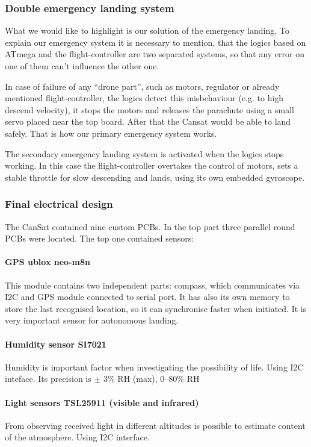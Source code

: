 \documentclass{cfp}
\begin{document}
\subsubsection{Double emergency landing system}
\par What we would like to highlight is our solution of the emergency landing. To explain our emergency system it is necessary to mention, that the logics based on ATmega and the flight-controller are two separated systems, so that any error on one of them can’t influence the other one. 
\par In case of failure of any “drone part”, such as motors, regulator or already mentioned flight-controller, the logics detect this misbehaviour (e.g. to high descend velocity), it stops the motors and releases the parachute using a small servo placed near the top board. After that the Cansat would be able to land safely. That is how our primary emergency system works.
\par The secondary emergency landing system is activated when the logics stops working. In this case the flight-controller overtakes the control of motors, sets a stable throttle for slow descending and lands, using its own embedded gyroscope.
\subsubsection{Final electrical design}
\par The CanSat contained nine custom PCBs. In the top part three parallel round PCBs were located. The top one contained sensors:
\paragraph{GPS ublox neo-m8n}This  module contains two independent parts: compass, which communicates via I2C and GPS module connected to serial port. It has also its own memory to store the last recognised location, so it can synchronise faster when initiated. It is very important sensor for autonomous landing.
\paragraph{Humidity sensor SI7021}Humidity is important factor when investigating the possibility of life. Using I2C inteface. Its precision is $\pm$ 3$\%$ RH (max), 0–80$\%$ RH
\paragraph{Light sensors TSL25911 (visible and infrared)}From observing received light in different altitudes is possible to estimate content of the atmosphere. Using I2C interface.
\end{document}
